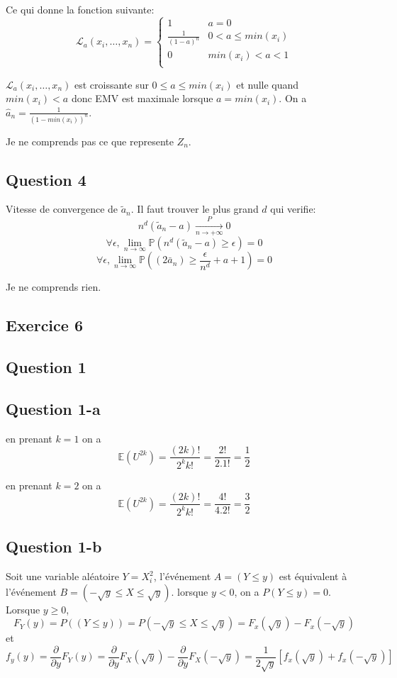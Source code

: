 \documentclass[]{book}
\theoremstyle{definition}
\begin{document}
Ce qui donne la fonction suivante:
$$
\mathcal{L}_a(x_i,\ldots,x_n) =     
\left\{
    \begin{array}{cc}
        1 &  a = 0 \\
        \frac{1}{(1-a)^n} & 0 < a \leq min(x_i)\\
        0 & min(x_i) < a < 1 \\
    \end{array}
\right.
$$ 

$\mathcal{L}_a(x_i,\ldots,x_n)$ est croissante sur $0 \leq a \leq min(x_i)$ et nulle quand $min(x_i) < a$ donc EMV est maximale lorsque $a=min(x_i)$. On a $\hat{a}_n = \frac{1}{(1-min(x_i))^n}$.  


Je ne comprends pas ce que represente $Z_{n}$.

\subsection*{Question 4}
Vitesse de convergence de $\tilde{a}_n$.
Il faut trouver le plus grand $d$ qui verifie:
$$
n^d(\tilde{a}_n-a) \xrightarrow[n \to +\infty]{P} 0
$$
$$
\forall \epsilon, \lim_{n \to \infty}{\mathbb{P}(n^d(\tilde{a}_n-a) \geq \epsilon)} = 0
$$
$$
\forall \epsilon, \lim_{n \to \infty}{\mathbb{P}((2\bar{a}_n) \geq \frac{\epsilon}{n^d} +a+1)} = 0
$$

Je ne comprends rien.

\subsection*{Exercice 6}
\subsection*{Question 1}
\subsection*{Question 1-a}

en prenant $k=1$ on a 
$$\mathbb{E}(U^{2k}) = \frac{(2k)!}{2^kk!} = \frac{2!}{2.1!} = \frac{1}{2}$$

en prenant $k=2$ on a 
$$\mathbb{E}(U^{2k}) = \frac{(2k)!}{2^kk!} = \frac{4!}{4.2!} = \frac{3}{2}$$

\subsection*{Question 1-b}
Soit une variable al\'eatoire $Y = X_i^2$, l'\'ev\'enement $A = (Y \leq y)$ est \'equivalent \`a l'\'ev\'enement $B = (-\sqrt{y} \leq X \leq \sqrt{y})$. lorsque $y < 0$, on a $P(Y \leq y)=0$.
Lorsque $y \geq 0$,
$$
F_{Y}(y) = P( (Y \leq y)) = P (-\sqrt{y} \leq X \leq \sqrt{y}) = F_{x}(\sqrt{y}) - F_{x}(-\sqrt{y})
$$
et
$$
f_{y}(y) = \frac{\partial}{\partial y} F_{Y}(y) = \frac{\partial}{\partial y} F_{X}(\sqrt{y}) - \frac{\partial}{\partial y} F_{X}(-\sqrt{y}) = \frac{1}{2\sqrt{y}}[f_{x}(\sqrt{y}) + f_{x}(-\sqrt{y})]
$$
\end{document}
